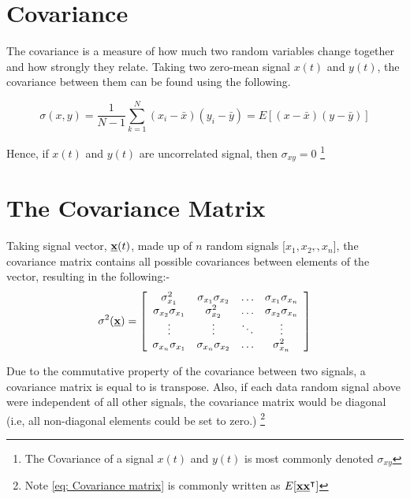 	
	\section{Covariance}
	The covariance is a measure of how much two random variables change together and how strongly they relate. Taking two zero-mean signal $x(t)$ and $y(t)$, the covariance between them can be found using the following.
	
	\begin{equation}
	\sigma(x,y) = \frac{1}{N-1}\sum_{k=1}^{N}(x_i - \bar{x})(y_i-\bar{y}) = E[(x - \bar{x})(y - \bar{y})] 
	\end{equation} 
	

	
	Hence, if $x(t)$ and $y(t)$
are uncorrelated signal, then $\sigma_{xy} = 0$ \footnote{The Covariance of a signal $x(t)$ and $y(t)$ is most commonly denoted $\sigma_{xy}$}

\section{The Covariance Matrix}

Taking signal vector, $\underline{\bf x} (t)$, made up of $n$ random signals [$x_1,x_2,\ddddot{},x_n$], the covariance matrix contains all possible covariances between elements of the vector, resulting in the following:-
\begin{equation}
\sigma^2(\underline{\bf x} )=\left[\begin{array}{cccc}
\sigma^2_{x_1} &\sigma_{x_1}\sigma_{x_2} &\dots& \sigma_{x_1}\sigma_{x_n}\\
\sigma_{x_2}\sigma_{x_1} &\sigma^2_{x_2} &\dots& \sigma_{x_2}\sigma_{x_n}\\
\vdots& \vdots& \ddots &\vdots\\
\sigma_{x_n}\sigma_{x_1} &\sigma_{x_n}\sigma_{x_2} &\dots&\sigma^2_{x_n} \\
\end{array}\right] \label{eq: Covariance matrix}
\end{equation}	

Due to the commutative property of the covariance between two signals, a covariance matrix is equal to is transpose. Also, if each data random signal above were independent of all other signals, the covariance matrix would be diagonal (i.e, all non-diagonal elements could be set to zero.) \footnote{Note \eqref{eq: Covariance matrix} is commonly written as $E[{\bf \underline{x}}{\bf \underline{x}}^\intercal]$}
\newpage

